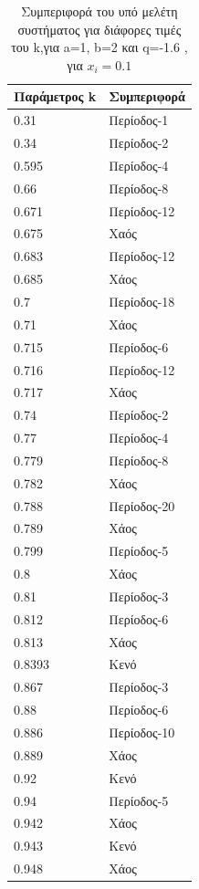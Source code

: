 \begin{table}[h!]
	\centering
	\begin{tabular}{l | l }
		Παράμετρος k & Συμπεριφορά \\
		\hline
		0.31 &  Περίοδος-1 \\
		0.34 &  Περίοδος-2 \\
		0.595& Περίοδος-4 \\
		0.66& Περίοδος-8 \\
		0.671 &  Περίοδος-12\\
		0.675& Χαός \\
		0.683& Περίοδος-12 \\
		0.685& Χάος \\
		0.7 &  Περίοδος-18\\
		0.71&  Χάος \\
		0.715 &  Περίοδος-6\\
		0.716 &  Περίοδος-12\\
		0.717 &  Χάος \\
		0.74 & Περίοδος-2\\
		0.77 &  Περίοδος-4 \\
		0.779 &  Περίοδος-8\\
		0.782 & Χάος\\
		0.788 & Περίοδος-20\\
		0.789 & Χάος\\
		0.799 & Περίοδος-5\\
		0.8 &Χάος\\
		0.81 & Περίοδος-3\\
		0.812 & Περίοδος-6\\
		0.813 & Χάος\\
		0.8393 & Κενό\\
		0.867 & Περίοδος-3\\
		0.88 & Περίοδος-6\\
		0.886 & Περίοδος-10\\
		0.889 & Χάος\\
		0.92 & Κενό\\
		0.94 & Περίοδος-5\\
		0.942 & Χάος\\
		0.943 & Κενό\\
		0.948 & Χάος\\
	\end{tabular}
	\caption{ Συμπεριφορά του υπό μελέτη συστήματος για διάφορες τιμές του k,για a=1, b=2 και q=-1.6 , για \(x_i=0.1\)}
	\label{tab:abc7}
\end{table}

